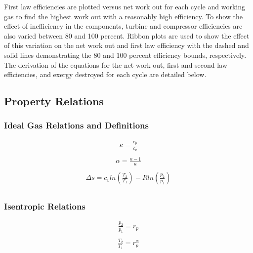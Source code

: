 \documentclass[
	12pt, %
]{brayton_cycle_report_style}
\begin{document}
First law efficiencies are plotted versus net work out for each cycle and working gas to find the highest work out with a reasonably high efficiency. To show the effect of inefficiency in the components, turbine and compressor efficiencies are also varied between 80 and 100 percent. Ribbon plots are used to show the effect of this variation on the net work out and first law efficiency with the dashed and solid lines demonstrating the 80 and 100 percent efficiency bounds, respectively. The derivation of the equations for the net work out, first and second law efficiencies, and exergy destroyed for each cycle are detailed below. 

\subsection{Property Relations}

\subsubsection{Ideal Gas Relations and Definitions}

\vspace{-5mm}

\begin{multicols}{3}
  \begin{align*}
    \kappa=\frac{c_p}{c_v}\\
  \end{align*}
  \vspace{1mm}
  \begin{align*}
    \alpha=\frac{\kappa-1}{\kappa} \\
  \end{align*}
  \vspace{1mm}
  \begin{align*}
    \Delta s = c_{v} ln \left( \frac{T_2}{T_1} \right) - R ln\left(  \frac{p_2}{p_1} \right)\\
  \end{align*}
\end{multicols}

\vspace{-15mm}

\subsubsection{Isentropic Relations}

\vspace{-5mm}

\begin{multicols}{2}
    \begin{align*}
      \frac{p_2}{p_1}=r_p \\
    \end{align*}
    \vspace{1mm}
    \begin{align*}
        \frac{T_2}{T_1}=r_p^\alpha
    \end{align*}
\end{multicols}
\end{document}
